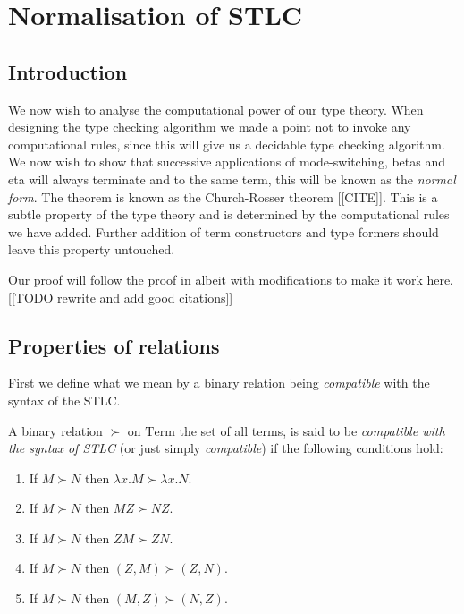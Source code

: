 \section{Normalisation of STLC}

\subsection{Introduction}
We now wish to analyse the computational power of our type theory. When designing the type checking algorithm we made a point not to invoke any computational rules, since this will give us a decidable type checking algorithm. We now wish to show that successive applications of mode-switching, betas and eta will always terminate and to the same term, this will be known as the \emph{normal form}. The theorem is known as the Church-Rosser theorem [[CITE]]. This is a subtle property of the type theory and is determined by the computational rules we have added. Further addition of term constructors and type formers should leave this property untouched.

Our proof will follow the proof in \cite[p. 67]{Sorensen} albeit with modifications to make it work here. [[TODO rewrite and add good citations]]

\subsection{Properties of relations}

First we define what we mean by a binary relation being \emph{compatible} with the syntax of the STLC.
\begin{defin}
    A binary relation $\succ$ on $\mathrm{Term}$ the set of all terms, is said to be \emph{compatible with the syntax of STLC} (or just simply \emph{compatible}) if the following conditions hold:
    \begin{enumerate}
        \item If $M \succ N$ then $\lambda x . M \succ \lambda x . N$.
        \item If $M \succ N$ then $M Z \succ N Z$.
        \item If $M \succ N$ then $Z M \succ Z N$.
        \item If $M \succ N$ then $(Z,M) \succ (Z,N)$.
        \item If $M \succ N$ then $(M, Z) \succ (N, Z)$.
    \end{enumerate}
\end{defin}

